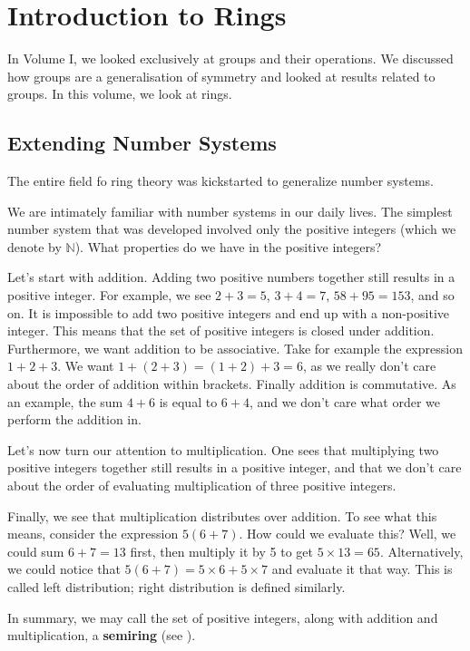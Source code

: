 \chapter{Introduction to Rings}
In Volume I, we looked exclusively at groups and their operations. We discussed how groups are a generalisation of symmetry and looked at results related to groups. In this volume, we look at rings.

\section{Extending Number Systems}
The entire field fo ring theory was kickstarted to generalize number systems.

We are intimately familiar with number systems in our daily lives. The simplest number system that was developed involved only the positive integers (which we denote by $\mathbb{N}$). What properties do we have in the positive integers?

Let's start with addition. Adding two positive numbers together still results in a positive integer. For example, we see $2 + 3 = 5$, $3 + 4 = 7$, $58 + 95 = 153$, and so on. It is impossible to add two positive integers and end up with a non-positive integer. This means that the set of positive integers is closed under addition. Furthermore, we want addition to be associative. Take for example the expression $1 + 2 + 3$. We want $1 + (2 + 3) = (1 + 2) + 3 = 6$, as we really don't care about the order of addition within brackets. Finally addition is commutative. As an example, the sum $4 + 6$ is equal to $6 + 4$, and we don't care what order we perform the addition in.

Let's now turn our attention to multiplication. One sees that multiplying two positive integers together still results in a positive integer, and that we don't care about the order of evaluating multiplication of three positive integers.

Finally, we see that multiplication distributes over addition. To see what this means, consider the expression $5(6+7)$. How could we evaluate this? Well, we could sum $6+7 = 13$ first, then multiply it by 5 to get $5\times13 = 65$. Alternatively, we could notice that $5(6+7) = 5 \times 6 + 5 \times 7$ and evaluate it that way. This is called left distribution; right distribution is defined similarly.

In summary, we may call the set of positive integers, along with addition and multiplication, a \textbf{semiring} (see \cite{mathworld_semiring-definition}).

